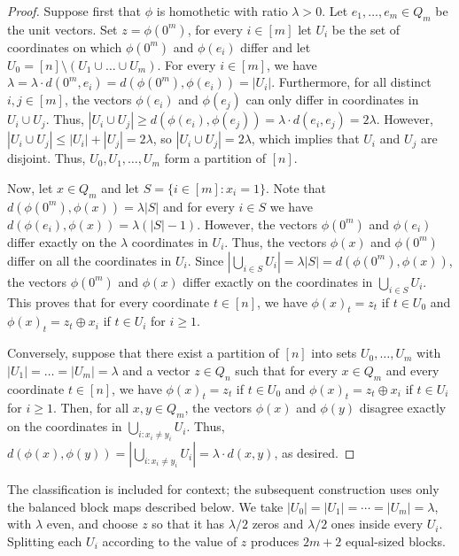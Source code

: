 \documentclass[11pt]{article}
\theoremstyle{remark}
\begin{document}
\begin{proof}
    Suppose first that $\phi$ is homothetic with ratio $\lambda > 0$.
    Let $e_1, \ldots, e_m \in Q_m$ be the unit vectors.
    Set $z = \phi(0^m)$, for every $i \in [m]$ let $U_i$ be the set of coordinates on which $\phi(0^m)$ and $\phi(e_i)$ differ and let $U_0 = [n] \setminus (U_1 \cup \ldots \cup U_m)$.
    For every $i \in [m]$, we have $\lambda = \lambda \cdot d(0^m, e_i) = d(\phi(0^m), \phi(e_i)) = |U_i|$.
    Furthermore, for all distinct $i, j \in [m]$, the vectors $\phi(e_i)$ and $\phi(e_j)$ can only differ in coordinates in $U_i \cup U_j$. Thus, $|U_i \cup U_j| \geq d(\phi(e_i), \phi(e_j)) = \lambda \cdot d(e_i, e_j) = 2\lambda$.
    However, $|U_i \cup U_j| \leq |U_i| + |U_j| = 2\lambda$, so $|U_i \cup U_j| = 2\lambda$, which implies that $U_i$ and $U_j$ are disjoint.
    Thus, $U_0, U_1, \ldots, U_m$ form a partition of $[n]$.
    
    Now, let $x \in Q_m$ and let $S = \{i \in [m] : x_i = 1\}$.
    Note that $d(\phi(0^m), \phi(x)) = \lambda |S|$ and for every $i \in S$ we have $d(\phi(e_i), \phi(x)) = \lambda (|S|-1)$.
    However, the vectors $\phi(0^m)$ and $\phi(e_i)$ differ exactly on the $\lambda$ coordinates in $U_i$.
    Thus, the vectors $\phi(x)$ and $\phi(0^m)$ differ on all the coordinates in $U_i$.
    Since $|\bigcup_{i \in S}U_i| = \lambda |S| = d(\phi(0^m), \phi(x))$, the vectors $\phi(0^m)$ and $\phi(x)$ differ exactly on the coordinates in $\bigcup_{i \in S}U_i$.
    This proves that for every coordinate $t \in [n]$, we have $\phi(x)_t = z_t$ if $t \in U_0$ and $\phi(x)_t = z_t \oplus x_i$ if $t \in U_i$ for $i \geq 1$.
    
    Conversely, suppose that there exist a partition of $[n]$ into sets $U_0, \ldots, U_m$ with $|U_1| = \ldots = |U_m| = \lambda$ and a vector $z \in Q_n$ such that for every $x \in Q_m$ and every coordinate $t \in [n]$, we have $\phi(x)_t = z_t$ if $t \in U_0$ and $\phi(x)_t = z_t \oplus x_i$ if $t \in U_i$ for $i \geq 1$.
    Then, for all $x, y \in Q_m$, the vectors $\phi(x)$ and $\phi(y)$ disagree exactly on the coordinates in $\bigcup_{i : x_i \neq y_i}U_i$.
    Thus, $d(\phi(x), \phi(y)) = |\bigcup_{i : x_i \neq y_i}U_i| = \lambda \cdot d(x, y)$, as desired.
\end{proof}

The classification is included for context; the subsequent construction uses only the balanced block maps described below.
We take $|U_0|=|U_1|=\cdots=|U_m|=\lambda$, with $\lambda$ even, and choose $z$ so that it has $\lambda/2$ zeros and $\lambda/2$ ones inside every $U_i$. 
Splitting each $U_i$ according to the value of $z$ produces $2m+2$ equal-sized blocks.
\end{document}
